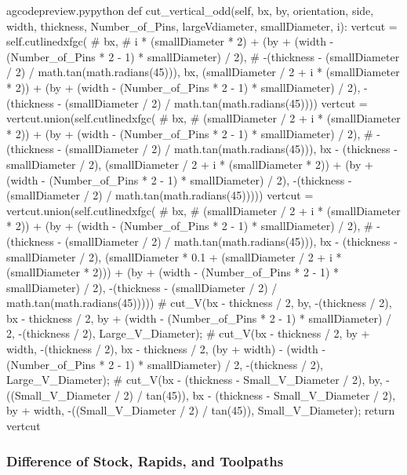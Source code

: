 \documentclass{ltxdoc}
\begin{document}
\begin{writecode}{a}{gcodepreview.py}{python}
    def cut_vertical_odd(self, bx, by, orientation, side, width, thickness, Number_of_Pins, largeVdiameter, smallDiameter, i):
        vertcut = self.cutlinedxfgc(
#            bx, 
#            i * (smallDiameter * 2) + (by + (width - (Number_of_Pins * 2 - 1) * smallDiameter) / 2), 
#            -(thickness - (smallDiameter / 2) / math.tan(math.radians(45))), 
            bx, 
            (smallDiameter / 2 + i * (smallDiameter * 2)) + (by + (width - (Number_of_Pins * 2 - 1) * smallDiameter) / 2), 
            -(thickness - (smallDiameter / 2) / math.tan(math.radians(45))))
        vertcut = vertcut.union(self.cutlinedxfgc(
#            bx, 
#            (smallDiameter / 2 + i * (smallDiameter * 2)) + (by + (width - (Number_of_Pins * 2 - 1) * smallDiameter) / 2), 
#            -(thickness - (smallDiameter / 2) / math.tan(math.radians(45))), 
            bx - (thickness - smallDiameter / 2), 
            (smallDiameter / 2 + i * (smallDiameter * 2)) + (by + (width - (Number_of_Pins * 2 - 1) * smallDiameter) / 2), 
            -(thickness - (smallDiameter / 2) / math.tan(math.radians(45)))))
        vertcut = vertcut.union(self.cutlinedxfgc(
#            bx, 
#            (smallDiameter / 2 + i * (smallDiameter * 2)) + (by + (width - (Number_of_Pins * 2 - 1) * smallDiameter) / 2), 
#            -(thickness - (smallDiameter / 2) / math.tan(math.radians(45))), 
            bx - (thickness - smallDiameter / 2), 
            (smallDiameter * 0.1 + (smallDiameter / 2 + i * (smallDiameter * 2))) + (by + (width - (Number_of_Pins * 2 - 1) * smallDiameter) / 2), 
            -(thickness - (smallDiameter / 2) / math.tan(math.radians(45)))))
#    cut_V(bx - thickness / 2, by, -(thickness / 2), bx - thickness / 2, by + (width - (Number_of_Pins * 2 - 1) * smallDiameter) / 2, -(thickness / 2), Large_V_Diameter);
#    cut_V(bx - thickness / 2, by + width, -(thickness / 2), bx - thickness / 2, (by + width) - (width - (Number_of_Pins * 2 - 1) * smallDiameter) / 2, -(thickness / 2), Large_V_Diameter);
#    cut_V(bx - (thickness - Small_V_Diameter / 2), by, -((Small_V_Diameter / 2) / tan(45)), bx - (thickness - Small_V_Diameter / 2), by + width, -((Small_V_Diameter / 2) / tan(45)), Small_V_Diameter);
        return vertcut

\end{writecode}
\addtocounter{gcpy}{153}

\subsubsection{Difference of Stock, Rapids, and Toolpaths}
\end{document}

